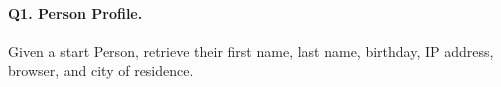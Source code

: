 \paragraph{\textbf{Q1}. Person Profile.}
Given a start Person, retrieve their first name, last name, birthday, IP
address, browser, and city of residence.
